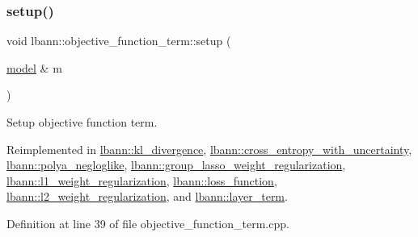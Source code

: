 \subsubsection{\texorpdfstring{setup()}{setup()}}
{\footnotesize\ttfamily void lbann\+::objective\+\_\+function\+\_\+term\+::setup (\begin{DoxyParamCaption}\item[{\hyperlink{classlbann_1_1model}{model} \&}]{m }\end{DoxyParamCaption})\hspace{0.3cm}{\ttfamily [virtual]}}

Setup objective function term. 

Reimplemented in \hyperlink{classlbann_1_1kl__divergence_acaa96d2e2fcf164c2e7b5cd5a0bf222e}{lbann\+::kl\+\_\+divergence}, \hyperlink{classlbann_1_1cross__entropy__with__uncertainty_a44a47468f1d04734068d085417eeab93}{lbann\+::cross\+\_\+entropy\+\_\+with\+\_\+uncertainty}, \hyperlink{classlbann_1_1polya__negloglike_a4a7ae8eef1ef216f60b158acb1853355}{lbann\+::polya\+\_\+negloglike}, \hyperlink{classlbann_1_1group__lasso__weight__regularization_af413161b1feefa3bb472079635547c57}{lbann\+::group\+\_\+lasso\+\_\+weight\+\_\+regularization}, \hyperlink{classlbann_1_1l1__weight__regularization_afcd238514ad132d66609efbb30de25ec}{lbann\+::l1\+\_\+weight\+\_\+regularization}, \hyperlink{classlbann_1_1loss__function_a17a3629e8519c4215ad776a0c7b522ae}{lbann\+::loss\+\_\+function}, \hyperlink{classlbann_1_1l2__weight__regularization_a0320afab573fbe77b5ba6d22ea5e0898}{lbann\+::l2\+\_\+weight\+\_\+regularization}, and \hyperlink{classlbann_1_1layer__term_ae6d84339fb80384ca2bf898fb854a7c9}{lbann\+::layer\+\_\+term}.



Definition at line 39 of file objective\+\_\+function\+\_\+term.\+cpp.


